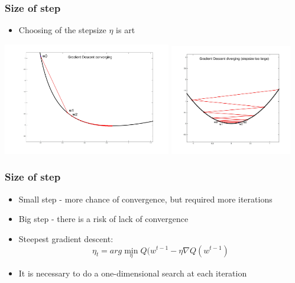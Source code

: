 \documentclass[default]{beamer}
\begin{document}
	\begin{frame}	
		\frametitle{Size of step}
		
		\Large
		\begin{itemize}
			\item Choosing of the stepsize  $\eta$ is art
			
		\end{itemize}
		
		\centering
		\includegraphics[width=0.55\textwidth]{linear_31.jpg}
		\includegraphics[width=0.4\textwidth]{linear_32.jpg}
	\end{frame}

	\begin{frame}	
		\frametitle{Size of step}
		
		\Large
		\begin{itemize}
			\item Small step - more chance of convergence, but required more iterations
			\item Big step - there is a risk of lack of convergence
			\item Steepest gradient descent:
				\[
					\eta_t = arg\min_\eta Q(w^{t-1}-\eta \nabla Q(w^{t-1})
				\]
			\item It is necessary to do a one-dimensional search at each iteration
		\end{itemize}

	\end{frame}
\end{document}
